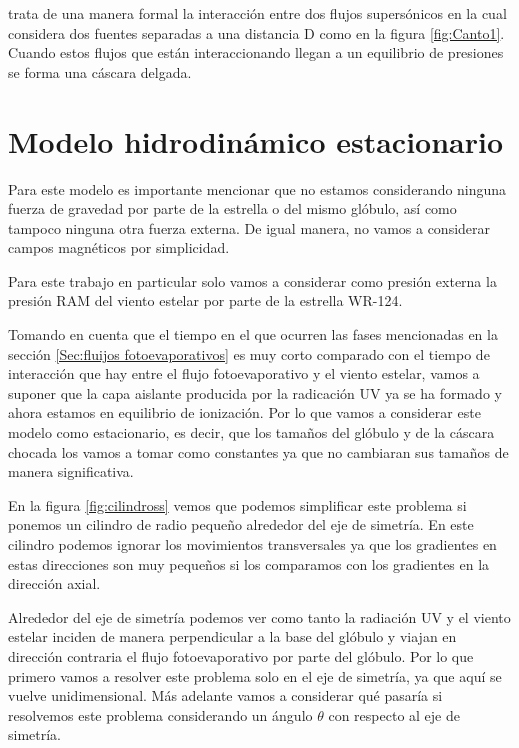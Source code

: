 \documentclass{book}
\begin{document}
\cite{Canto:1996} trata de una manera formal la interacción entre dos flujos supersónicos en la cual considera dos fuentes separadas a una distancia D como en la figura \ref{fig:Canto1}. Cuando estos flujos que están interaccionando llegan a un equilibrio de presiones se forma una cáscara delgada.


\section{Modelo hidrodinámico estacionario}

Para este modelo es importante mencionar que no estamos considerando ninguna fuerza de gravedad por parte de la estrella o del mismo glóbulo, así como tampoco ninguna otra fuerza externa. De igual manera, no vamos a considerar campos magnéticos por simplicidad.

Para este trabajo en particular solo vamos a considerar como presión externa la presión RAM del viento estelar por parte de la estrella WR-124.

Tomando en cuenta que el tiempo en el que ocurren las fases mencionadas en la sección \ref{Sec:fluijos fotoevaporativos} es muy corto comparado con el tiempo de interacción que hay entre el flujo fotoevaporativo y el viento estelar, vamos a suponer que la capa aislante producida por la radicación UV ya se ha formado y ahora estamos en equilibrio de ionización. Por lo que vamos a considerar este modelo como estacionario, es decir, que los tamaños del glóbulo y de la cáscara chocada los vamos a tomar como constantes ya que no cambiaran sus tamaños de manera significativa.

En la figura \ref{fig:cilindross} vemos que podemos simplificar este problema si ponemos un cilindro de radio pequeño alrededor del eje de simetría.  En este cilindro podemos ignorar los movimientos transversales ya que los gradientes en estas direcciones son muy pequeños si los comparamos con los gradientes en la dirección axial. 

Alrededor del eje de simetría podemos ver como tanto la radiación UV y el viento estelar inciden de manera perpendicular a la base del glóbulo y viajan en dirección contraria el flujo fotoevaporativo por parte del glóbulo. Por lo que primero vamos a resolver este problema solo en el eje de simetría, ya que aquí se vuelve unidimensional. Más adelante vamos a considerar qué pasaría si resolvemos este problema considerando un ángulo $\theta$ con respecto al eje de simetría.
\end{document}
